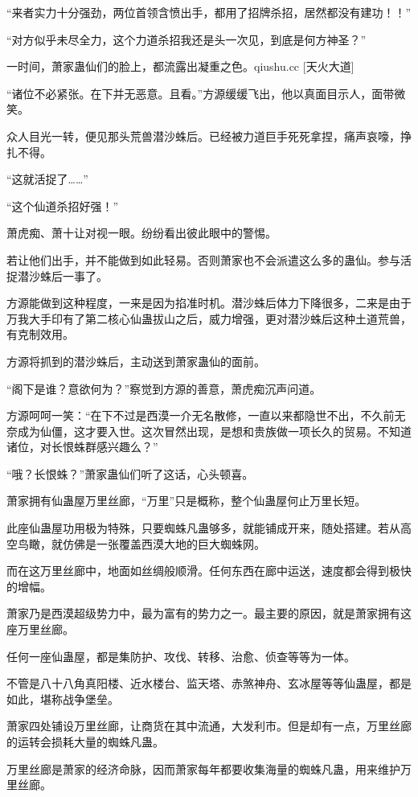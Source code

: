 \begin{this_body}
“来者实力十分强劲，两位首领含愤出手，都用了招牌杀招，居然都没有建功！！”

“对方似乎未尽全力，这个力道杀招我还是头一次见，到底是何方神圣？”

一时间，萧家蛊仙们的脸上，都流露出凝重之色。qiushu.cc [天火大道]

“诸位不必紧张。在下并无恶意。且看。”方源缓缓飞出，他以真面目示人，面带微笑。

众人目光一转，便见那头荒兽潜沙蛛后。已经被力道巨手死死拿捏，痛声哀嚎，挣扎不得。

“这就活捉了……”

“这个仙道杀招好强！”

萧虎痴、萧十让对视一眼。纷纷看出彼此眼中的警惕。

若让他们出手，并不能做到如此轻易。否则萧家也不会派遣这么多的蛊仙。参与活捉潜沙蛛后一事了。

方源能做到这种程度，一来是因为掐准时机。潜沙蛛后体力下降很多，二来是由于万我大手印有了第二核心仙蛊拔山之后，威力增强，更对潜沙蛛后这种土道荒兽，有克制效用。

方源将抓到的潜沙蛛后，主动送到萧家蛊仙的面前。

“阁下是谁？意欲何为？”察觉到方源的善意，萧虎痴沉声问道。

方源呵呵一笑：“在下不过是西漠一介无名散修，一直以来都隐世不出，不久前无奈成为仙僵，这才要入世。这次冒然出现，是想和贵族做一项长久的贸易。不知道诸位，对长恨蛛群感兴趣么？”

“哦？长恨蛛？”萧家蛊仙们听了这话，心头顿喜。

萧家拥有仙蛊屋万里丝廊，“万里”只是概称，整个仙蛊屋何止万里长短。

此座仙蛊屋功用极为特殊，只要蜘蛛凡蛊够多，就能铺成开来，随处搭建。若从高空鸟瞰，就仿佛是一张覆盖西漠大地的巨大蜘蛛网。

而在这万里丝廊中，地面如丝绸般顺滑。任何东西在廊中运送，速度都会得到极快的增幅。

萧家乃是西漠超级势力中，最为富有的势力之一。最主要的原因，就是萧家拥有这座万里丝廊。

任何一座仙蛊屋，都是集防护、攻伐、转移、治愈、侦查等等为一体。

不管是八十八角真阳楼、近水楼台、监天塔、赤煞神舟、玄冰屋等等仙蛊屋，都是如此，堪称战争堡垒。

萧家四处铺设万里丝廊，让商货在其中流通，大发利市。但是却有一点，万里丝廊的运转会损耗大量的蜘蛛凡蛊。

万里丝廊是萧家的经济命脉，因而萧家每年都要收集海量的蜘蛛凡蛊，用来维护万里丝廊。


\end{this_body}
